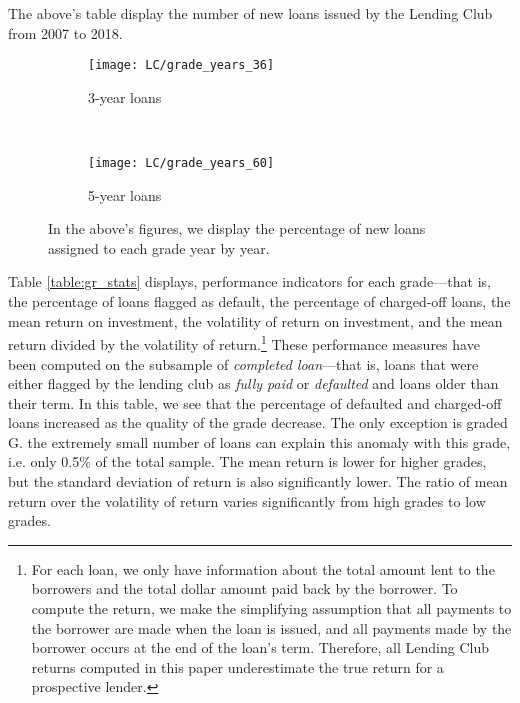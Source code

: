 \documentclass[12pt]{article} %
\begin{document}
\begin{table}[t!]
   \centering

   \caption{The above's table display the number of new loans issued by the Lending Club from 2007 to 2018.
}
\label{table:nb_loan}
\end{table}


\begin{figure*}[t!]
    \centering
    \begin{subfigure}{0.5\textwidth}
        \centering
        \texttt{[image: LC/grade\_years\_36]}
        \caption{3-year loans}
        \label{fig:grade_years_36}
    \end{subfigure}%
    ~ 
    \begin{subfigure}{0.5\textwidth}
        \centering
        \texttt{[image: LC/grade\_years\_60]}
            \caption{5-year loans}
        \label{fig:grade_years_60}
    \end{subfigure}
    \caption{
    In the above's figures, we display the percentage of new loans assigned to each grade year by year.
}
\end{figure*}

Table \ref{table:gr_stats} displays, performance indicators for each grade---that is, the percentage of loans flagged as default, the percentage of charged-off loans, the mean return on investment, the volatility of return on investment, and the mean return divided by the volatility of return.\footnote{For each loan, we only have information about the total amount lent to the borrowers and the total dollar amount paid back by the borrower. To compute the return, we make the simplifying assumption that all payments to the borrower are made when the loan is issued, and all payments made by the borrower occurs at the end of the loan's term. Therefore, all Lending Club returns computed in this paper underestimate the true return for a prospective lender.} These performance measures have been computed on the subsample of \textit{completed loan}---that is, loans that were either flagged by the lending club as \textit{fully paid} or \textit{defaulted} and loans older than their term. In this table, we see that the percentage of defaulted and charged-off loans increased as the quality of the grade decrease. The only exception is graded G. the extremely small number of loans can explain this anomaly with this grade, i.e. only 0.5\% of the total sample. The mean return is lower for higher grades, but the standard deviation of return is also significantly lower. The ratio of mean return over the volatility of return varies significantly from high grades to low grades. 
\end{document}
